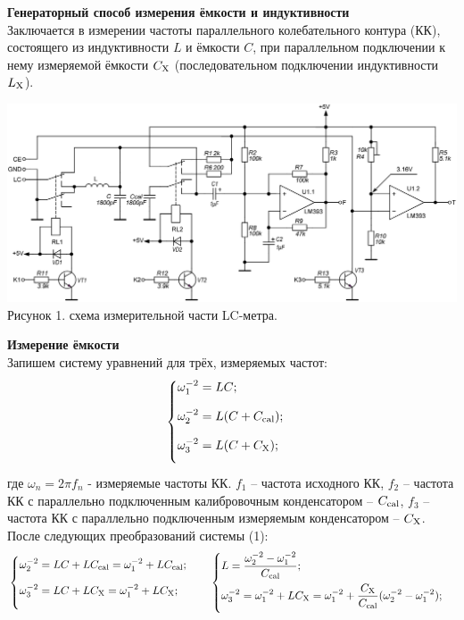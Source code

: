 \documentclass[12pt,a4paper]{article}
\newcommand{\ds}{\displaystyle}
\newcommand{\cc}{C_{\rm cal}}
\newcommand{\cx}{C_{\rm X}}
\newcommand{\lx}{L_{\rm X}}
\begin{document}
	\textbf{Генераторный способ измерения ёмкости и индуктивности} \\
	Заключается в измерении частоты параллельного колебательного контура (КК), состоящего из 
	индуктивности $L$ и ёмкости $C$, при параллельном подключении к нему измеряемой ёмкости $\cx$ 
	(последовательном подключении индуктивности $\lx$).
	\begin{center}
		\includegraphics[scale=0.6]{sheme.png}
		Рисунок 1. схема измерительной части LC-метра.
	\end{center}	
	\textbf{Измерение ёмкости} \\
	Запишем систему уравнений для трёх, измеряемых частот:
	\begin{equation}
		\begin{cases}
			\ds \omega_1^{-2} = LC; \\[9pt]
			\ds \omega_2^{-2} = L(C+\cc); \\[9pt]
			\ds \omega_3^{-2} = L(C+\cx); \\[9pt]
		\end{cases}
	\end{equation}
	где $\ds\omega_n=2\pi f_n$ - измеряемые частоты КК.
	$\ds f_1$ -- частота исходного КК,
	$\ds f_2$ -- частота КК с параллельно подключенным 
	калибровочным конденсатором -- $\ds\cc$,
	$\ds f_3$ -- частота КК с параллельно подключенным 
	измеряемым конденсатором -- $\ds\cx$.
	После следующих преобразований системы (1): \\
	\begin{equation*}
	\begin{cases}
		\ds \omega_2^{-2} = LC + L\cc = \omega_1^{-2} + L\cc; \\[9pt]
		\ds \omega_3^{-2} = LC + L\cx = \omega_1^{-2} + L\cx; \\[9pt]
	\end{cases} \quad
	\begin{cases}
		\ds L = \frac{\omega_2^{-2} - \omega_1^{-2}}{\cc}; \\[9pt]
		\ds \omega_3^{-2} = \omega_1^{-2} + L\cx = 
		\omega_1^{-2} + \frac{\cx}{\cc}(\omega_2^{-2} - \omega_1^{-2}); \\[9pt]
	\end{cases}
	\end{equation*}
\end{document}
